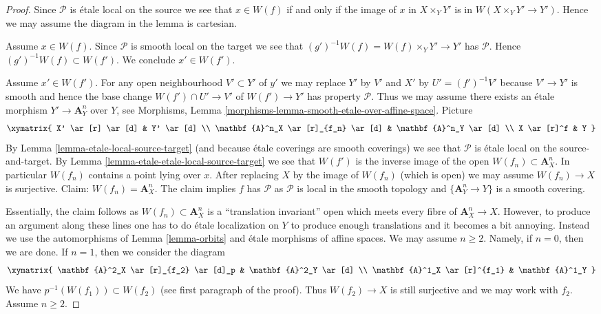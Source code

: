 \begin{proof}
Since $\mathcal{P}$ is \'etale local on the source we see
that $x \in W(f)$ if and only if the image of $x$ in
$X \times_Y Y'$ is in $W(X \times_Y Y' \to Y')$. Hence we
may assume the diagram in the lemma is cartesian.

\medskip\noindent
Assume $x \in W(f)$. Since $\mathcal{P}$ is smooth local on the target
we see that $(g')^{-1}W(f) = W(f) \times_Y Y' \to Y'$ has $\mathcal{P}$.
Hence $(g')^{-1}W(f) \subset W(f')$. We conclude $x' \in W(f')$.

\medskip\noindent
Assume $x' \in W(f')$.
For any open neighbourhood $V' \subset Y'$ of $y'$ we may replace
$Y'$ by $V'$ and $X'$ by $U' = (f')^{-1}V'$ because $V' \to Y'$ is smooth
and hence the base change $W(f') \cap U' \to V'$ of $W(f') \to Y'$
has property $\mathcal{P}$. Thus we may assume there exists
an \'etale morphism $Y' \to \mathbf{A}^n_Y$ over $Y$, see
Morphisms, Lemma \ref{morphisms-lemma-smooth-etale-over-affine-space}.
Picture
$$
\xymatrix{
X' \ar[r] \ar[d] & Y' \ar[d] \\
\mathbf{A}^n_X \ar[r]_{f_n} \ar[d] & \mathbf{A}^n_Y \ar[d] \\
X \ar[r]^f & Y
}
$$
By Lemma \ref{lemma-etale-local-source-target}
(and because \'etale coverings are smooth coverings)
we see that $\mathcal{P}$ is \'etale local on the source-and-target.
By Lemma \ref{lemma-etale-etale-local-source-target}
we see that $W(f')$ is the inverse image of
the open $W(f_n) \subset \mathbf{A}^n_X$. In particular
$W(f_n)$ contains a point lying over $x$.
After replacing $X$ by the image of $W(f_n)$ (which is open)
we may assume $W(f_n) \to X$ is surjective.
Claim: $W(f_n) = \mathbf{A}^n_X$.
The claim implies $f$ has $\mathcal{P}$ as
$\mathcal{P}$ is local in the smooth topology
and $\{\mathbf{A}^n_Y \to Y\}$ is a smooth covering.

\medskip\noindent
Essentially, the claim follows as $W(f_n) \subset \mathbf{A}^n_X$ is a
``translation invariant'' open which meets every fibre of
$\mathbf{A}^n_X \to X$. However, to produce an argument along these lines
one has to do \'etale localization on $Y$ to produce enough translations
and it becomes a bit annoying. Instead we use the automorphisms
of Lemma \ref{lemma-orbits} and \'etale morphisms of affine spaces.
We may assume $n \geq 2$. Namely, if $n = 0$, then we are done.
If $n = 1$, then we consider the diagram
$$
\xymatrix{
\mathbf{A}^2_X \ar[r]_{f_2} \ar[d]_p & \mathbf{A}^2_Y \ar[d] \\
\mathbf{A}^1_X \ar[r]^{f_1} & \mathbf{A}^1_Y
}
$$
We have $p^{-1}(W(f_1)) \subset W(f_2)$ (see first paragraph
of the proof). Thus $W(f_2) \to X$ is still surjective
and we may work with $f_2$. Assume $n \geq 2$.


\end{proof}
